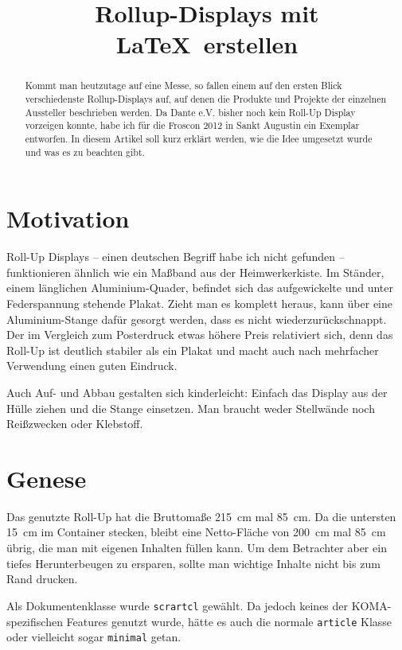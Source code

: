 \documentclass[12pt,ngerman]{dtk}
\title{Rollup-Displays mit \LaTeX\ erstellen}
\begin{document}
\maketitle

\begin{abstract}
Kommt man heutzutage auf eine Messe, so fallen einem auf den ersten Blick verschiedenste Rollup-Displays auf, auf denen die Produkte und Projekte der einzelnen Aussteller beschrieben werden. Da Dante e.V. bisher noch kein Roll-Up Display vorzeigen konnte, habe ich für die Froscon 2012 in Sankt Augustin ein Exemplar entworfen. In diesem Artikel soll kurz erklärt werden, wie die Idee umgesetzt wurde und was es zu beachten gibt.
\end{abstract}

\section{Motivation}

Roll-Up Displays -- einen deutschen Begriff habe ich nicht gefunden -- funktionieren ähnlich wie ein Maßband aus der Heimwerkerkiste. Im Ständer, einem länglichen Aluminium-Quader, befindet sich das aufgewickelte und unter Federspannung stehende Plakat. Zieht man es komplett heraus, kann über eine Aluminium-Stange dafür gesorgt werden, dass es nicht wiederzurückschnappt. Der im Vergleich zum Posterdruck etwas höhere Preis relativiert sich, denn das Roll-Up ist deutlich stabiler als ein Plakat und macht auch nach mehrfacher Verwendung einen guten Eindruck.

Auch Auf- und Abbau gestalten sich kinderleicht: Einfach das Display aus der Hülle ziehen und die Stange einsetzen. Man braucht weder Stellwände noch Reißzwecken oder Klebstoff.

\section{Genese}

Das genutzte Roll-Up hat die Bruttomaße \SI{215}{\centi\meter} mal \SI{85}{\centi\meter}. Da die untersten \SI{15}{\centi\meter} im Container stecken, bleibt  eine Netto-Fläche von \SI{200}{\centi\meter} mal \SI{85}{\centi\meter} übrig, die man mit eigenen Inhalten füllen kann. Um dem Betrachter aber ein tiefes Herunterbeugen zu ersparen, sollte man wichtige Inhalte nicht bis zum Rand drucken.

Als Dokumentenklasse wurde \texttt{scrartcl} gewählt. Da jedoch keines der KOMA-spezifischen Features genutzt wurde, hätte es auch die normale \texttt{article} Klasse oder vielleicht sogar \texttt{minimal} getan.
\end{document}
